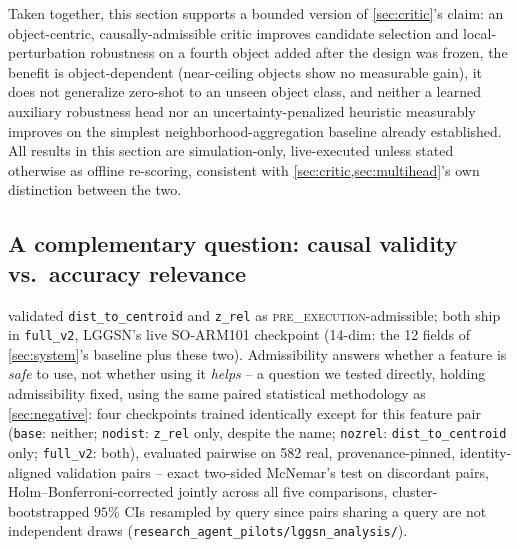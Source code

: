 \documentclass[journal]{IEEEtran}
\begin{document}
Taken together, this section supports a bounded version of \cref{sec:critic}'s
claim: an object-centric, causally-admissible critic improves candidate
selection and local-perturbation robustness on a fourth object added after
the design was frozen, the benefit is object-dependent (near-ceiling
objects show no measurable gain), it does not generalize zero-shot to an
unseen object class, and neither a learned auxiliary robustness head nor an
uncertainty-penalized heuristic measurably improves on the simplest
neighborhood-aggregation baseline already established. All results in this
section are simulation-only, live-executed unless stated otherwise as
offline re-scoring, consistent with \cref{sec:critic,sec:multihead}'s own
distinction between the two.

\subsection{A complementary question: causal validity vs.\ accuracy relevance}
\label{sec:lggsnablation}

 validated \texttt{dist\_to\_centroid} and
\texttt{z\_rel} as \textsc{pre\_execution}-admissible; both ship in
\texttt{full\_v2}, LGGSN's live SO-ARM101 checkpoint (14-dim: the 12
fields of \cref{sec:system}'s baseline plus these two). Admissibility
answers whether a feature is \emph{safe} to use, not whether using it
\emph{helps} -- a question we tested directly, holding admissibility
fixed, using the same paired statistical methodology as
\cref{sec:negative}: four checkpoints trained identically except for
this feature pair (\texttt{base}: neither; \texttt{nodist}:
\texttt{z\_rel} only, despite the name; \texttt{nozrel}:
\texttt{dist\_to\_centroid} only; \texttt{full\_v2}: both), evaluated
pairwise on 582 real, provenance-pinned, identity-aligned validation
pairs -- exact two-sided McNemar's test on discordant pairs,
Holm--Bonferroni-corrected jointly across all five comparisons,
cluster-bootstrapped $95\%$ CIs resampled by query since pairs sharing a
query are not independent draws (\texttt{research\_agent\_pilots/}\allowbreak\texttt{lggsn\_analysis/}).
\end{document}
